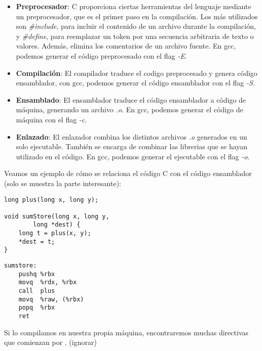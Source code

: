\begin{itemize}
	\item \textbf{Preprocesador}: C proporciona ciertas herramientas del lenguaje mediante un preprocesador,
	      que es el primer paso en la compilación. Los más utilizados son \textit{\#include}, para incluir el contenido de un archivo
	      durante la compilación, y \textit{\#define}, para reemplazar un token por una secuencia arbitraria de texto
	      o valores. Además, elimina los comentarios de un archivo fuente. En gcc, podemos generar el código preprocesado con el flag \textit{-E}.
	\item \textbf{Compilación}: El compilador traduce el codigo preprocesado y genera código ensamblador, con gcc, podemos
	      generar el código ensamblador con el flag \textit{-S}.
	\item \textbf{Ensamblado}: El ensamblador traduce el código ensamblador a código de máquina, generando un archivo \textit{.o}.
	      En gcc, podemos generar el código de máquina con el flag \textit{-c}.
	\item \textbf{Enlazado}: El enlazador combina los distintos archivos \textit{.o} generados en un solo ejecutable. También se encarga de combinar
	      las librerias que se hayan utilizado en el código. En gcc, podemos generar el ejecutable con el flag \textit{-o}.
\end{itemize}


\begin{ejemplo}
	Veamos un ejemplo de cómo se relaciona el código C con el código ensamblador (solo se muestra la parte interesante):
	\begin{center} %
		\begin{minipage}{0.45\textwidth}
			\begin{verbatim}
long plus(long x, long y);

void sumStore(long x, long y,
        long *dest) {
    long t = plus(x, y);
    *dest = t;
}
                \end{verbatim}
		\end{minipage}
		\begin{minipage}{0.45\textwidth}
			\begin{verbatim}
sumstore:
    pushq %rbx
    movq  %rdx, %rbx
    call  plus
    movq  %raw, (%rbx)
    popq  %rbx
    ret
                \end{verbatim}
		\end{minipage}
	\end{center}
\end{ejemplo}
Si lo compilamos en nuestra propia máquina, encontraremos muchas directivas que comienzan por . (ignorar)
